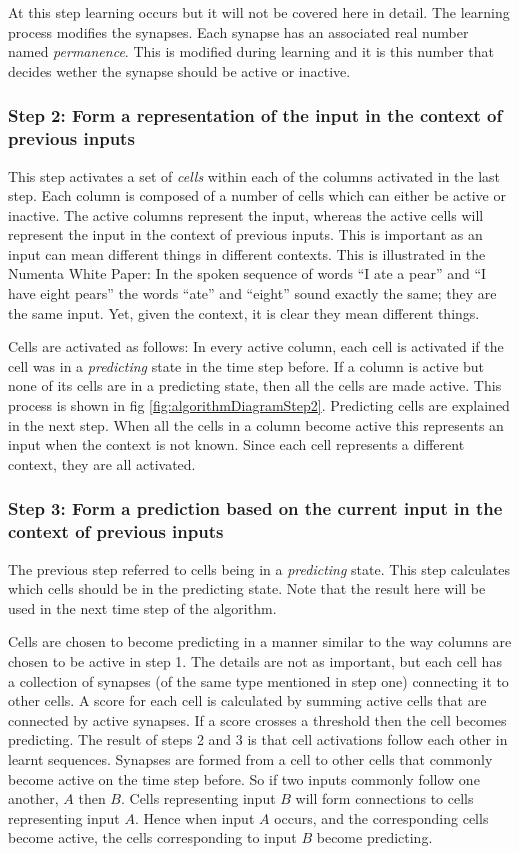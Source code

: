 \documentclass[a4paper]{jpconf}
\begin{document}
			At this step learning occurs but it will not be covered here in detail. The learning process modifies the synapses. Each synapse has an associated real number named \emph{permanence}. This is modified during learning and it is this number that decides wether the synapse should be active or inactive.

		\subsubsection{Step 2: Form a representation of the input in the context of previous inputs}
			This step activates a set of \emph{cells} within each of the columns activated in the last step. Each column is composed of a number of cells which can either be active or inactive. The active columns represent the input, whereas the active cells will represent the input in the context of previous inputs. This is important as an input can mean different things in different contexts. This is illustrated in the Numenta White Paper: In the spoken sequence of words ``I ate a pear'' and ``I have eight pears'' the words ``ate'' and ``eight'' sound exactly the same; they are the same input. Yet, given the context, it is clear they mean different things.
			
			Cells are activated as follows: In every active column, each cell is activated if the cell was in a \emph{predicting} state in the time step before. If a column is active but none of its cells are in a predicting state, then all the cells are made active. This process is shown in fig \ref{fig:algorithmDiagramStep2}. Predicting cells are explained in the next step. When all the cells in a column become active this represents an input when the context is not known. Since each cell represents a different context, they are all activated.
			
		\subsubsection{Step 3: Form a prediction based on the current input in the context of previous inputs}\label{step3}
		The previous step referred to cells being in a \emph{predicting} state. This step calculates which cells should be in the predicting state. Note that the result here will be used in the next time step of the algorithm.
		
		Cells are chosen to become predicting in a manner similar to the way columns are chosen to be active in step 1. The details are not as important, but each cell has a collection of synapses (of the same type mentioned in step one) connecting it to other cells. A score for each cell is calculated by summing active cells that are connected by active synapses. If a score crosses a threshold then the cell becomes predicting. The result of steps 2 and 3 is that cell activations follow each other in learnt sequences. Synapses are formed from a cell to other cells that commonly become active on the time step before. So if two inputs commonly follow one another, $A$ then $B$. Cells representing input $B$ will form connections to cells representing input $A$. Hence when input $A$ occurs, and the corresponding cells become active, the cells corresponding to input $B$ become predicting.
		
\end{document}
